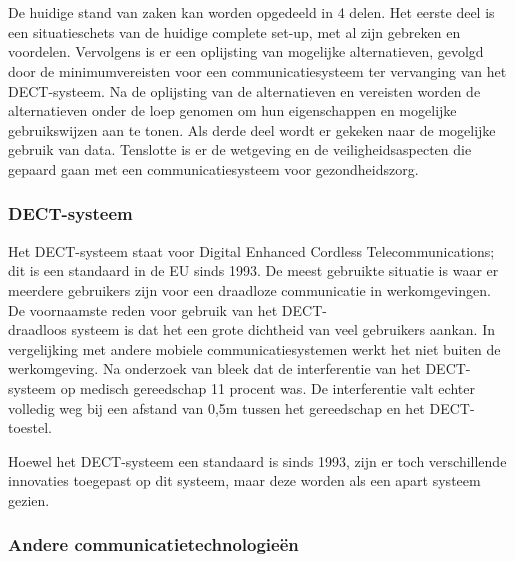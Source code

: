 \chapter{}%
\label{ch:stand-van-zaken}



De huidige stand van zaken kan worden opgedeeld in 4 delen. Het eerste deel is een situatieschets van de huidige complete set-up, met al zijn gebreken en voordelen. Vervolgens is er een oplijsting van mogelijke alternatieven, gevolgd door de minimumvereisten voor een communicatiesysteem ter vervanging van het DECT-systeem. Na de oplijsting van de alternatieven en vereisten worden de alternatieven onder de loep genomen om hun eigenschappen en mogelijke gebruikswijzen aan te tonen. Als derde deel wordt er gekeken naar de mogelijke gebruik van data. Tenslotte is er de wetgeving en de veiligheidsaspecten die gepaard gaan met een communicatiesysteem voor gezondheidszorg.

\subsection{DECT-systeem}
Het DECT-systeem staat voor Digital Enhanced Cordless Telecommunications; dit is een standaard in de EU sinds 1993. De meest gebruikte situatie is waar er meerdere gebruikers zijn voor een draadloze communicatie in werkomgevingen. De voornaamste reden voor gebruik van het DECT-\\draadloos systeem is dat het een grote dichtheid van veel gebruikers aankan. In vergelijking met andere mobiele communicatiesystemen werkt het niet buiten de werkomgeving. \autocite{Welinder1997} Na onderzoek van \textcite{Welinder1997} bleek dat de interferentie van het DECT-systeem op medisch gereedschap 11 procent was. De interferentie valt echter volledig weg bij een afstand van 0,5m tussen het gereedschap en het DECT-toestel.


Hoewel het DECT-systeem een standaard is sinds 1993, zijn er toch verschillende innovaties toegepast op dit systeem, maar deze worden als een apart systeem gezien. 

\subsection{Andere communicatietechnologieën}


